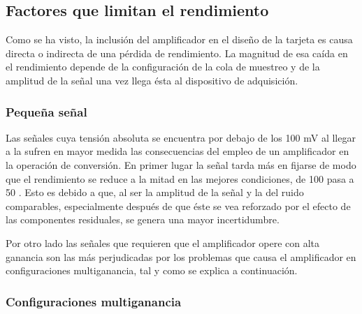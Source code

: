 \subsection{Factores que limitan el rendimiento}

Como se ha visto, la inclusión del amplificador en el diseño de la tarjeta
es causa directa o indirecta de una pérdida de rendimiento. La magnitud de
esa caída en el rendimiento depende de la configuración de la cola de
muestreo y de la amplitud de la señal una vez llega ésta al dispositivo de
adquisición.

\sshortpage{}

\subsubsection{Pequeña señal}

Las señales cuya tensión absoluta se encuentra por debajo de los 100 mV al
llegar a la \kpci{} sufren en mayor medida las consecuencias del empleo de
un amplificador en la operación de conversión. En primer lugar la señal
tarda más en fijarse de modo que el rendimiento se reduce a la mitad en las
mejores condiciones, de 100 \kms{} pasa a 50 \kms{}. Esto es debido a que,
al ser la amplitud de la señal y la del ruido comparables, especialmente
después de que éste se vea reforzado por el efecto de las componentes
residuales, se genera una mayor incertidumbre.

Por otro lado las señales que requieren que el amplificador opere con alta
ganancia son las más perjudicadas por los problemas que causa el
amplificador en configuraciones multiganancia, tal y como se explica a
continuación.


\subsubsection{Configuraciones multiganancia}

